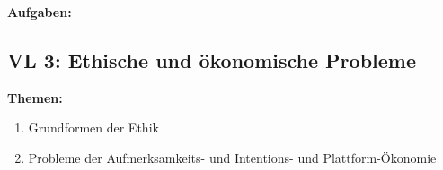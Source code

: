 \documentclass[a4paper]{article}%
\begin{document}
\bigskip

\textbf{Aufgaben:}



\bigskip



\clearpage
\subsection{VL 3: Ethische und ökonomische Probleme}


\textbf{Themen:}

\begin{enumerate}
\item Grundformen der Ethik







\item Probleme der Aufmerksamkeits- und Intentions- und Plattform-Ökonomie
\end{enumerate}
\end{document}
